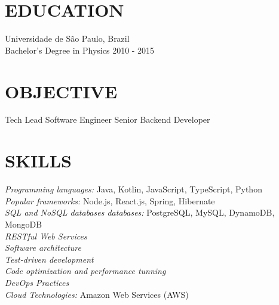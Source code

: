 \documentclass[margin, 10pt]{res} %
\begin{document}
\begin{resume}


\section{EDUCATION}

Universidade de São Paulo, Brazil \\
Bachelor's Degree in Physics \hfill 2010 - 2015


\section{OBJECTIVE}

Tech Lead \textbar\space Software Engineer \textbar\space Senior Backend Developer
 

\section{SKILLS}

{\sl Programming languages:} Java, Kotlin, JavaScript, TypeScript, Python \\
{\sl Popular frameworks:} Node.js, React.js, Spring, Hibernate \\
{\sl SQL and NoSQL databases databases:} PostgreSQL, MySQL, DynamoDB, MongoDB \\
{\sl RESTful Web Services} \\
{\sl Software architecture} \\
{\sl Test-driven development} \\
{\sl Code optimization and performance tunning} \\
{\sl DevOps Practices} \\
{\sl Cloud Technologies:} Amazon Web Services (AWS)
 
 

\end{resume}
\end{document}
